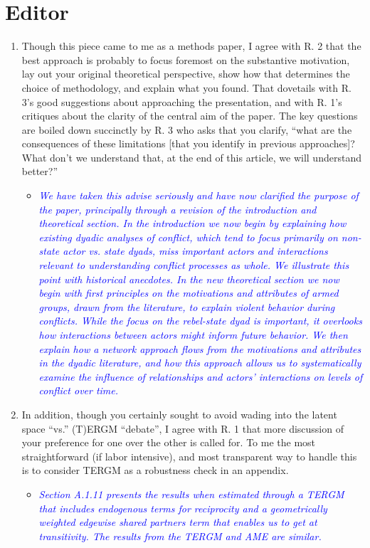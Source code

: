 \section{Editor}

\begin{enumerate}
	\item Though this piece came to me as a methods paper, I agree with R. 2 that the best approach is probably to focus foremost on the substantive motivation, lay out your original theoretical perspective, show how that determines the choice of methodology, and explain what you found. That dovetails with R. 3's good suggestions about approaching the presentation, and with R. 1's critiques about the clarity of the central aim of the paper. The key questions are boiled down succinctly by R. 3 who asks that you clarify, ``what are the consequences of these limitations [that you identify in previous approaches]? What don't we understand that, at the end of this article, we will understand better?''
	\begin{itemize}
		\item \textcolor{blue}{ \emph{
		We have taken this advise seriously and have now clarified the purpose of the paper, principally through a revision of the introduction and theoretical section. In the introduction we now begin by explaining how existing dyadic analyses of conflict, which tend to focus primarily on non-state actor vs. state dyads, miss important actors and interactions relevant to understanding conflict processes as whole. We illustrate this point with historical anecdotes. In the new theoretical section we now begin with first principles on the motivations and attributes of armed groups, drawn from the literature, to explain violent behavior during conflicts. While the focus on the rebel-state dyad is important, it overlooks how interactions between actors might inform future behavior. We then explain how a network approach flows from the motivations and attributes in the dyadic literature, and how this approach allows us to systematically examine the influence of relationships and actors' interactions on levels of conflict over time.  }}
	\end{itemize}	
	\item In addition, though you certainly sought to avoid wading into the latent space ``vs.'' (T)ERGM ``debate'', I agree with R. 1 that more discussion of your preference for one over the other is called for. To me the most straightforward (if labor intensive), and most transparent way to handle this is to consider TERGM as a robustness check in an appendix.
	\begin{itemize}
		\item \textcolor{blue}{ \emph{
		Section A.1.11 presents the results when estimated through a TERGM that includes endogenous terms for reciprocity and a geometrically weighted edgewise shared partners term that enables us to get at transitivity. The results from the TERGM and AME are similar. 
		}}
	\end{itemize}		
\end{enumerate}